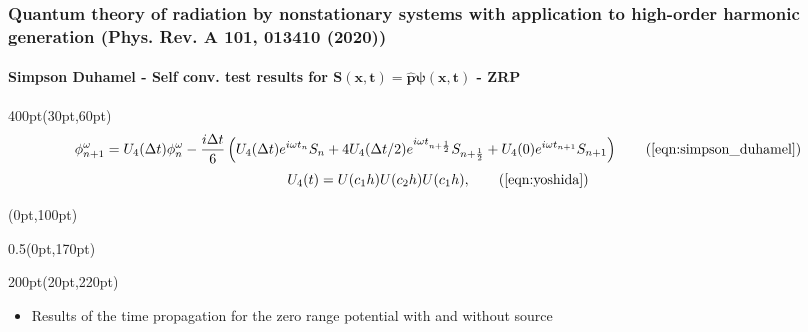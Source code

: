 \begin{frame}
\frametitle{Quantum theory of radiation by nonstationary systems 
	with application to high-order harmonic generation
        (Phys. Rev. A 101, 013410 (2020))}
	\framesubtitle{Simpson Duhamel - 
	Self conv. test results for 
	$\mathbf{S(x,t) = \hat{p}\psi(x,t)}$ - ZRP }
\footnotesize
\begin{textblock*}{400pt}(30pt,60pt)
	\begin{equation}
		\phi^\omega_{n+1} = U_4(\Delta t) \phi^\omega_{n}
		- \frac{i\Delta t}{6}\left(
		  U_4(\Delta t)  e^{i\omega t_{n}}     S_{n}
		+ 4 U_4(\Delta t/2) e^{i\omega t_{n+\frac{1}{2}}} S_{n+\frac{1}{2}}
		+   U_4(0) e^{i\omega t_{n+1}} S_{n+1}
		\right)
		 \tag{\ref{eqn:simpson_duhamel}}
	\end{equation}
 	\begin{equation}
		U_4(t) =  U(c_1h)  U(c_2h)  U(c_1h),    
		 \tag{\ref{eqn:yoshida}}
 	\end{equation}
\end{textblock*}

\footnotesize
\begin{textblock*}{\linewidth}(0pt,100pt)
\end{textblock*}
\begin{textblock*}{0.5\linewidth}(0pt,170pt)
\end{textblock*}


\begin{textblock*}{200pt}(20pt,220pt)
	\begin{itemize}
	 \item Results of the time propagation for the zero range potential
		 with and without source
	\end{itemize}
\end{textblock*}



\end{frame}
